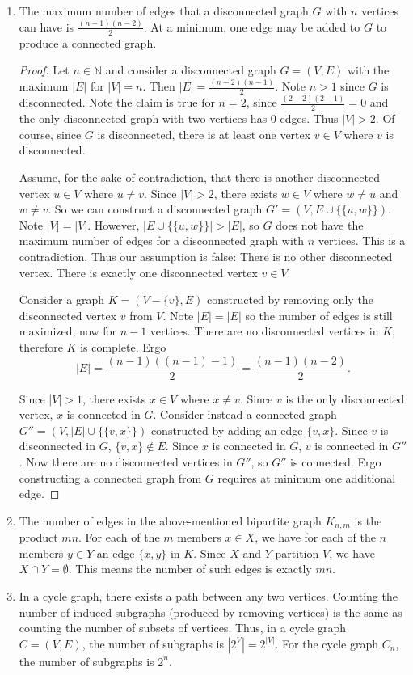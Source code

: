 \documentclass{article}
\newcommand{\N}{\mathbb{N}}
\theoremstyle{definition}
\begin{document}
\begin{solution}
\begin{enumerate}
\item
The maximum number of edges that a disconnected graph $G$ with $n$ vertices can have is $\frac{(n-1)(n-2)}{2}$. At a minimum, one edge may be added to $G$ to produce a connected graph.
\begin{proof} Let $n\in\N$ and consider a disconnected graph $G=(V,E)$ with the maximum $|E|$ for $|V|=n$. Then $|E|=\frac{(n-2)(n-1)}{2}$. Note $n>1$ since $G$ is disconnected. Note the claim is true for $n=2$, since $\frac{(2-2)(2-1)}{2}=0$ and the only disconnected graph with two vertices has 0 edges. Thus $|V|>2$. Of course, since $G$ is disconnected, there is at least one vertex $v\in V$ where $v$ is disconnected.

Assume, for the sake of contradiction, that there is another disconnected vertex $u\in V$ where $u\neq v$. Since $|V|>2$, there exists $w\in V$ where $w\neq u$ and $w\neq v$. So we can construct a disconnected graph $G'=(V,E\cup\{\{u,w\}\})$. Note $|V|=|V|$. However, $|E\cup\{\{u,w\}\}|>|E|$, so $G$ does not have the maximum number of edges for a disconnected graph with $n$ vertices. This is a contradiction. Thus our assumption is false: There is no other disconnected vertex. There is exactly one disconnected vertex $v\in V$.

Consider a graph $K=(V-\{v\},E)$ constructed by removing only the disconnected vertex $v$ from $V$. Note $|E|=|E|$ so the number of edges is still maximized, now for $n-1$ vertices. There are no disconnected vertices in $K$, therefore $K$ is complete. Ergo \[|E|=\frac{(n-1)((n-1)-1)}{2}=\frac{(n-1)(n-2)}{2}.\]

Since $|V|>1$, there exists $x\in V$ where $x\neq v$. Since $v$ is the only disconnected vertex, $x$ is connected in $G$. Consider instead a connected graph $G''=(V,|E|\cup\{\{v,x\}\})$ constructed by adding an edge $\{v,x\}$. Since $v$ is disconnected in $G$, $\{v,x\}\notin E$. Since $x$ is connected in $G$, $v$ is connected in $G''$. Now there are no disconnected vertices in $G''$, so $G''$ is connected. Ergo constructing a connected graph from $G$ requires at minimum one additional edge.
\end{proof}
\item The number of edges in the above-mentioned bipartite graph $K_{n,m}$ is the product $mn$. For each of the $m$ members $x\in X$, we have for each of the $n$ members $y\in Y$ an edge $\{x,y\}$ in $K$. Since $X$ and $Y$ partition $V$, we have $X\cap Y=\emptyset$. This means the number of such edges is exactly $mn$.
\item In a cycle graph, there exists a path between any two vertices. Counting the number of induced subgraphs (produced by removing vertices) is the same as counting the number of subsets of vertices. Thus, in a cycle graph $C=(V,E)$, the number of subgraphs is $|2^V|=2^{|V|}$. For the cycle graph $C_n$, the number of subgraphs is $2^n$.
\end{enumerate}
\end{solution}
\end{document}
